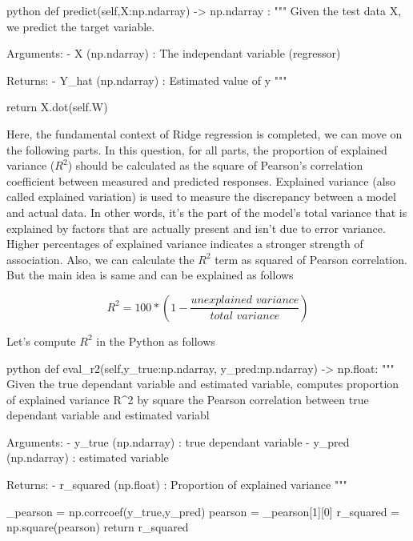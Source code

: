 \documentclass[12pt]{amsart}
\begin{document}
\begin{mintedbox}{python}
    def predict(self,X:np.ndarray) -> np.ndarray :
        """
            Given the test data X, we predict the target variable.
            
                Arguments:
                    - X (np.ndarray) : The independant variable (regressor)

                Returns:
                    - Y_hat (np.ndarray) : Estimated value of y
        """
              
        return X.dot(self.W)
\end{mintedbox}

Here, the fundamental context of Ridge regression is completed, we can move on the following parts. In this question, for all parts, the proportion of explained variance ($R^2$) should be calculated as the square of Pearson's correlation coefficient between measured and predicted responses. Explained variance (also called explained variation) is used to measure the discrepancy between a model and actual data. In other words, it’s the part of the model’s total variance that is explained by factors that are actually present and isn’t due to error variance. Higher percentages of explained variance indicates a stronger strength of association. Also, we can calculate the $R^2$ term as squared of Pearson correlation. But the main idea is same and can be explained as follows

\begin{equation}
    R^2 = 100 * \left(1 - \frac{\textit{unexplained variance}}{\textit{total variance} }\right)
\end{equation} 

Let's compute $R^2$ in the Python as follows
\begin{mintedbox}{python}
    def eval_r2(self,y_true:np.ndarray, y_pred:np.ndarray) -> np.float:
        """
            Given the true dependant variable and estimated variable, computes proportion of explained variance R^2 by square the Pearson correlation between true dependant variable and estimated variabl
            
                Arguments:
                    - y_true (np.ndarray) : true dependant variable
                    - y_pred (np.ndarray) : estimated variable
                    
                Returns:
                    - r_squared (np.float) : Proportion of explained variance
        """

        _pearson = np.corrcoef(y_true,y_pred)
        pearson = _pearson[1][0]
        r_squared = np.square(pearson)
        return r_squared
\end{mintedbox}
\end{document}
